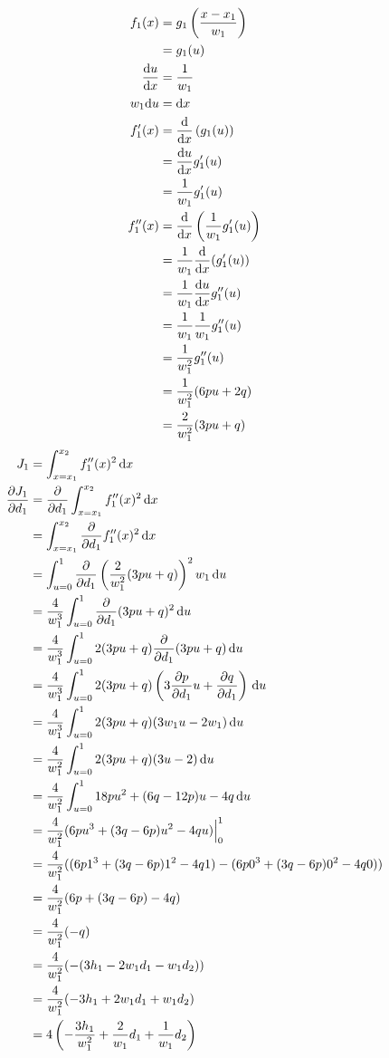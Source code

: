 \documentclass{article}
\begin{document}
\begin{align*}
  f_1(x)
  &= g_1\left(\frac{x-x_1}{w_1}\right) \\
  &= g_1(u) \\
  \frac{\mathrm{d}u}{\mathrm{d}x}
  &= \frac{1}{w_1} \\
  w_1\mathrm{d}u
  &= \mathrm{d}x \\
  f_1'(x)
  &= \frac{\mathrm{d}}{\mathrm{d}x} \left(g_1(u)\right) \\
  &= \frac{\mathrm{d}u}{\mathrm{d}x} g_1'(u) \\
  &= \frac{1}{w_1}g_1'(u) \\
  f_1''(x)
  &= \frac{\mathrm{d}}{\mathrm{d}x} \left(\frac{1}{w_1}g_1'(u)\right) \\
  &= \frac{1}{w_1} \frac{\mathrm{d}}{\mathrm{d}x} (g_1'(u)) \\
  &= \frac{1}{w_1} \frac{\mathrm{d}u}{\mathrm{d}x} g_1''(u) \\
  &= \frac{1}{w_1} \frac{1}{w_1} g_1''(u) \\
  &= \frac{1}{w_1^2} g_1''(u) \\
  &= \frac{1}{w_1^2}(6pu+2q) \\
  &= \frac{2}{w_1^2}(3pu+q)
\end{align*}
\begin{align*}
  J_1
  &= \int_{x=x_1}^{x_2}f_1''(x)^2\, \mathrm{d}x \\
  \frac{\partial J_1}{\partial d_1}
  &= \frac{\partial}{\partial d_1} \int_{x=x_1}^{x_2} f_1''(x)^2 \, \mathrm{d}x \\
  &= \int_{x=x_1}^{x_2} \frac{\partial}{\partial d_1} f_1''(x)^2 \, \mathrm{d}x \\
  &= \int_{u=0}^{1} \frac{\partial}{\partial d_1} \left(\frac{2}{w_1^2}(3pu+q)\right)^2 w_1 \, \mathrm{d}u \\
  &= \frac{4}{w_1^3} \int_{u=0}^{1} \frac{\partial}{\partial d_1} (3pu+q)^2 \, \mathrm{d}u \\
  &= \frac{4}{w_1^3} \int_{u=0}^{1} 2(3pu+q) \frac{\partial}{\partial d_1} (3pu+q) \, \mathrm{d}u \\
  &= \frac{4}{w_1^3} \int_{u=0}^{1} 2(3pu+q) \left(3\frac{\partial p}{\partial d_1}u+\frac{\partial q}{\partial d_1}\right) \, \mathrm{d}u \\
  &= \frac{4}{w_1^3} \int_{u=0}^{1} 2(3pu+q)(3w_1u-2w_1) \, \mathrm{d}u \\
  &= \frac{4}{w_1^2} \int_{u=0}^{1} 2(3pu+q)(3u-2) \, \mathrm{d}u \\
  &= \frac{4}{w_1^2} \int_{u=0}^{1} 18pu^2+(6q-12p)u-4q \, \mathrm{d}u \\
  &= \frac{4}{w_1^2} (6pu^3+(3q-6p)u^2-4qu)\Bigr|_0^1 \\
  &= \frac{4}{w_1^2} ((6p1^3+(3q-6p)1^2-4q1)-(6p0^3+(3q-6p)0^2-4q0)) \\
  &= \frac{4}{w_1^2} (6p+(3q-6p)-4q) \\
  &= \frac{4}{w_1^2} (-q) \\
  &= \frac{4}{w_1^2} (-(3h_1-2w_1d_1-w_1d_2)) \\
  &= \frac{4}{w_1^2} (-3h_1+2w_1d_1+w_1d_2) \\
  &= 4\left(-\frac{3h_1}{w_1^2}+\frac{2}{w_1}d_1+\frac{1}{w_1}d_2\right)
\end{align*}
\end{document}
